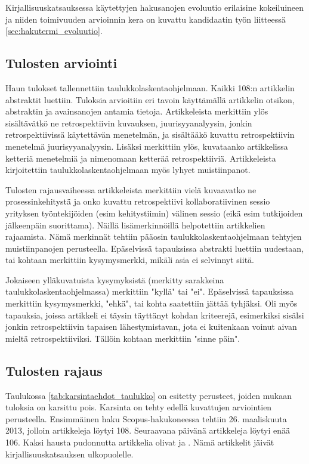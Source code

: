 Kirjallisuuskatsauksessa käytettyjen hakusanojen evoluutio erilaisine kokeiluineen ja niiden toimivuuden arvioinnin kera on kuvattu kandidaatin työn liitteessä \ref{sec:hakutermi_evoluutio}.

\subsection{Tulosten arviointi}
Haun tulokset tallennettiin taulukkolaskentaohjelmaan. Kaikki 108:n artikkelin abstraktit luettiin. Tuloksia arvioitiin eri tavoin käyttämällä artikkelin otsikon, abstraktin ja avainsanojen antamia tietoja. Artikkeleista merkittiin ylös sisältävätkö ne retrospektiivin kuvauksen, juurisyyanalyysin, jonkin retrospektiivissä käytettävän menetelmän, ja sisältääkö kuvattu retrospektiivin menetelmä juurisyyanalyysin. Lisäksi merkittiin ylös, kuvataanko artikkelissa ketteriä menetelmiä ja nimenomaan ketterää retrospektiiviä. Artikkeleista kirjoitettiin taulukkolaskentaohjelmaan myös lyhyet muistiinpanot.

Tulosten rajausvaiheessa artikkeleista merkittiin vielä kuvaavatko ne prosessinkehitystä ja onko kuvattu retrospektiivi kollaboratiivinen sessio yrityksen työntekijöiden (esim kehitystiimin) välinen sessio (eikä esim tutkijoiden jälkeenpäin suorittama). Näillä lisämerkinnöillä helpotettiin artikkelien rajaamista. Nämä merkinnät tehtiin pääosin taulukkolaskentaohjelmaan tehtyjen muistiinpanojen perusteella. Epäselvissä tapauksissa abstrakti luettiin uudestaan, tai  kohtaan merkittiin kysymysmerkki, mikäli asia ei selvinnyt siitä.

Jokaiseen ylläkuvatuista kysymyksistä (merkitty sarakkeina taulukkolaskentaohjelmassa) merkittiin "kyllä" tai "ei". Epäselvissä tapauksissa merkittiin kysymysmerkki, "ehkä", tai kohta saatettiin jättää tyhjäksi. Oli myös tapauksia, joissa artikkeli ei täysin täyttänyt kohdan kriteerejä, esimerkiksi sisälsi jonkin retrospektiivin tapaisen lähestymistavan, jota ei kuitenkaan voinut aivan mieltä retrospektiiviksi. Tällöin kohtaan merkittiin "sinne päin".

\subsection{Tulosten rajaus}
Taulukossa \ref{tab:karsintaehdot_taulukko} on esitetty perusteet, joiden mukaan tuloksia on karsittu pois. Karsinta on tehty edellä kuvattujen arviointien perusteella. Ensimmäinen haku Scopus-hakukoneessa tehtiin 26. maaliskuuta 2013, jolloin artikkeleja löytyi 108. Seuraavana päivänä artikkeleja löytyi enää 106. Kaksi hausta pudonnutta artikkelia olivat \citep{bolosky2007farsite} ja \citep{dreiseitl2005nomographic}. Nämä artikkelit jäivät kirjallisuuskatsauksen ulkopuolelle.

